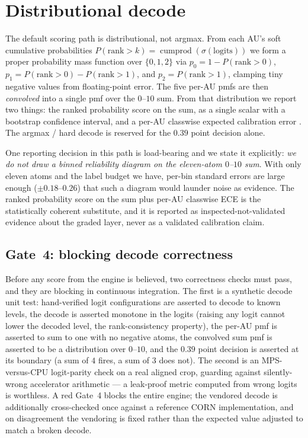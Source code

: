 \section{Distributional decode}
\label{sec:eng-decode}

The default scoring path is distributional, not argmax. From each AU's soft
cumulative probabilities $P(\text{rank}>k) = \operatorname{cumprod}(\sigma(\text{logits}))$
we form a proper probability mass function over $\{0,1,2\}$ via
$p_0 = 1 - P(\text{rank}>0)$, $p_1 = P(\text{rank}>0) - P(\text{rank}>1)$, and
$p_2 = P(\text{rank}>1)$, clamping tiny negative values from floating-point
error. The five per-AU pmfs are then \emph{convolved} into a single pmf over the
$0$--$10$ sum. From that distribution we report two things: the ranked
probability score on the sum, as a single scalar with a bootstrap confidence
interval, and a per-AU classwise expected calibration error
\citep{guo2017calibration}. The argmax / hard decode is reserved for the $0.39$
point decision alone.

One reporting decision in this path is load-bearing and we state it explicitly:
\emph{we do not draw a binned reliability diagram on the eleven-atom $0$--$10$
sum}. With only eleven atoms and the label budget we have, per-bin standard
errors are large enough ($\pm 0.18$--$0.26$) that such a diagram would launder
noise as evidence. The ranked probability score on the sum plus per-AU classwise
ECE is the statistically coherent substitute, and it is reported as
inspected-not-validated evidence about the graded layer, never as a validated
calibration claim.

\subsection{Gate~4: blocking decode correctness}
\label{sec:eng-decode-gate4}

Before any score from the engine is believed, two correctness checks must pass,
and they are blocking in continuous integration. The first is a synthetic
decode unit test: hand-verified logit configurations are asserted to decode to
known levels, the decode is asserted monotone in the logits (raising any logit
cannot lower the decoded level, the rank-consistency property), the per-AU pmf
is asserted to sum to one with no negative atoms, the convolved sum pmf is
asserted to be a distribution over $0$--$10$, and the $0.39$ point decision is
asserted at its boundary (a sum of $4$ fires, a sum of $3$ does not). The second
is an MPS-versus-CPU logit-parity check on a real aligned crop, guarding against
silently-wrong accelerator arithmetic --- a leak-proof metric computed from
wrong logits is worthless. A red Gate~4 blocks the entire engine; the vendored
decode is additionally cross-checked once against a reference CORN implementation,
and on disagreement the vendoring is fixed rather than the expected value
adjusted to match a broken decode.

